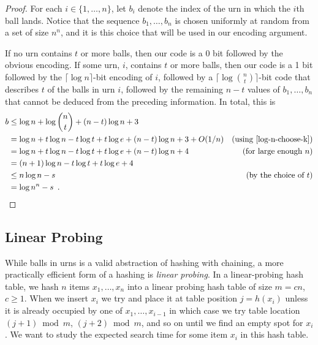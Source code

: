 \documentclass[lotsofwhite]{patmorin}
\begin{document}
\begin{proof}
  For each $i\in\{1,\ldots,n\}$, let $b_i$ denote the index of the urn in
  which the $i$th ball lands. Notice that the sequence $b_1,\ldots,b_n$
  is chosen uniformly at random from a set of size $n^n$, and it is this
  choice that will be used in our encoding argument.

  If no urn contains $t$ or more balls, then our code is a 0 bit followed
  by the obvious encoding. If some urn, $i$, contains $t$ or more balls,
  then our code is a 1 bit followed by the $\lceil \log n\rceil$-bit
  encoding of $i$, followed by a $\lceil\log\binom{n}{t}\rceil$-bit
  code that describes $t$ of the balls in urn $i$, followed by the
  remaining $n-t$ values of $b_1,\ldots,b_n$ that cannot be deduced from
  the preceding information.  In total, this is
  \begin{align*}
    b &\le \log n + \log\binom{n}{t} 
           + (n-t)\log n + 3 \\
     & = \log n + t\log n - t\log t + t\log e  
           + (n-t)\log n + 3 + O(1/n)
             & \text{(using \eqref{log-n-choose-k})} \\
     & = \log n + t\log n - t\log t + t\log e  
           + (n-t)\log n + 4
             & \text{(for large enough $n$)} \\
     & = (n+1)\log n - t\log t + t\log e + 4 \\
     & \le  n\log n - s &\text{(by the choice of $t$)} \\
     & =  \log n^n - s \enspace . & \qedhere
  \end{align*}
\end{proof}

\subsection{Linear Probing}

While balls in urns is a valid abstraction of hashing with chaining, a more practically efficient form of a hashing is \emph{linear probing}.  
In a linear-probing hash table, we hash $n$ items $x_1,\ldots,x_n$ into
a linear probing hash table of size $m=cn$, $c\ge 1$. When we insert
$x_i$ we try and place it at table position $j=h(x_i)$ unless it is
already occupied by one of $x_1,\ldots,x_{i-1}$ in which case we try
table location $(j+1)\bmod m$, $(j+2)\bmod m$, and so on until we find
an empty spot for $x_i$.  We want to study the expected search time for
some item $x_i$ in this hash table.
\end{document}
